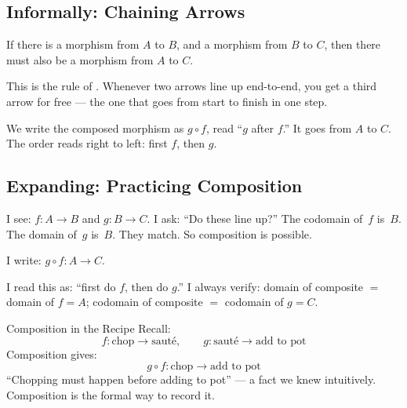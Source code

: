 \subsection{Informally: Chaining Arrows}

If there is a morphism from $A$ to $B$, and a morphism from $B$ to $C$, then
there must also be a morphism from $A$ to $C$.

This is the rule of . Whenever two arrows line up end-to-end,
you get a third arrow for free --- the one that goes from start to finish in one
step.

\medskip
\begin{center}
\end{center}
\medskip

We write the composed morphism as $g \circ f$, read ``$g$ after $f$.'' It goes
from $A$ to $C$. The order reads right to left: first $f$, then $g$.

\subsection{Expanding: Practicing Composition}

\begin{dialog}
I see: $f : A \to B$ and $g : B \to C$. I ask: ``Do these line up?'' The
codomain of~$f$ is~$B$. The domain of~$g$ is~$B$. They match. So composition
is possible.

I write: $g \circ f : A \to C$.

I read this as: ``first do $f$, then do $g$.'' I always verify:
domain of composite $=$ domain of $f = A$; codomain of composite $=$ codomain
of $g = C$.
\end{dialog}

\begin{example}{Composition in the Recipe}
Recall:
\[
  f : \text{chop} \to \text{sauté}, \qquad g : \text{sauté} \to \text{add to pot}
\]
Composition gives:
\[
  g \circ f : \text{chop} \to \text{add to pot}
\]
``Chopping must happen before adding to pot'' --- a fact we knew intuitively.
Composition is the formal way to record it.
\end{example}


